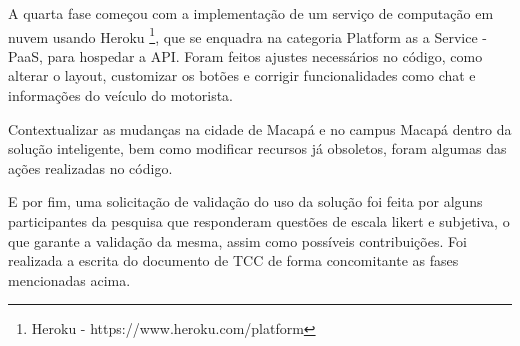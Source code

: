 A quarta fase começou com a implementação de um serviço de computação em nuvem usando Heroku \footnote{Heroku - https://www.heroku.com/platform}, que se enquadra na categoria Platform as a Service - PaaS, para hospedar a API. Foram feitos ajustes necessários no código, como alterar o layout, customizar os botões e corrigir funcionalidades como chat e informações do veículo do motorista.

Contextualizar as mudanças na cidade de Macapá e no campus Macapá dentro da solução inteligente, bem como modificar recursos já obsoletos, foram algumas das ações realizadas no código.

E por fim, uma solicitação de validação do uso da solução foi feita por alguns participantes da pesquisa que responderam questões de escala likert e subjetiva, o que garante a validação da mesma, assim como possíveis contribuições. Foi realizada a escrita do documento de TCC de forma concomitante as fases mencionadas acima.